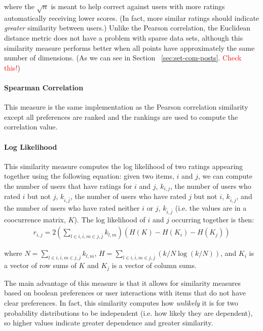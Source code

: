 \documentclass{article}
\begin{document}
where the $\sqrt{n}$ is meant to help correct against users with more ratings automatically receiving lower scores. 
(In fact, more similar ratings should indicate \emph{greater} similarity between users.) Unlike the Pearson correlation,
the Euclidean distance metric does not have a problem with sparse data sets, although this similarity measure 
performs better when all points have approximately the same number of dimensions. (As we can see in Section
~\ref{sec:set-com-posts}. \textcolor{red}{Check this!})

\paragraph{Spearman Correlation}

This measure is the same implementation as the Pearson correlation similarity except all preferences are ranked and the 
rankings are used to compute the correlation value.

\paragraph{Log Likelihood}

This similarity measure computes the log likelihood of two ratings appearing together using the following equation: given two items, $i$ and $j$, we can compute the number of users that have ratings for $i$ and $j$, $k_{i,j}$, the number of users
who rated $i$ but not $j$, $k_{i,\overline{j}}$, the number of users who have rated $j$ but
not $i$, $k_{\overline{i}, j}$, and the number of users who have rated neither $i$ or $j$, 
$k_{\overline{i}, \overline{j}}$ (i.e. the values are in a coocurrence matrix, $K$). 
The log likelihood of $i$ and $j$ occurring together is
then:\begin{align*}
r_{i, j} = 2 \left(\sum_{l \in {i, \overline{i}}, m \in {j, \overline{j}}} k_{l, m} \right)(H(K) - H(K_i) - H(K_j))
\end{align*}

where $N = \sum_{l \in {i, \overline{i}}, m \in {j, \overline{j}}} k_{l, m}$, $H = \sum_{l \in {i, \overline{i}}, m \in {j, \overline{j}}}\left(k/N \log(k/N)\right)$, and $K_i$ is a vector of row sums of $K$ and $K_j$ is a vector of column sums. 

The main advantage of this measure is that it allows for similarity measures based on boolean preferences or user
interactions with items that do not have clear preferences. In fact, this similarity computes how \emph{unlikely} it is
for two probability distributions to be independent (i.e. how likely they are dependent), so higher values indicate 
greater dependence and greater similarity.
\end{document}

